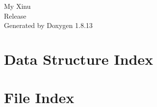 \documentclass[twoside]{article}
\newcommand{\+}{\discretionary{\mbox{\scriptsize$\hookleftarrow$}}{}{}}
\begin{document}
\hypersetup{pageanchor=false,
             bookmarksnumbered=true,
             pdfencoding=unicode
            }
\begin{titlepage}
\vspace*{7cm}
\begin{center}%
{\Large My Xinu \\[1ex]\large Release }\\
\vspace*{1cm}
{\large Generated by Doxygen 1.8.13}\\
\end{center}
\end{titlepage}
\tableofcontents
{}
\hypersetup{pageanchor=true}

\section{Data Structure Index}

\section{File Index}

\end{document}
